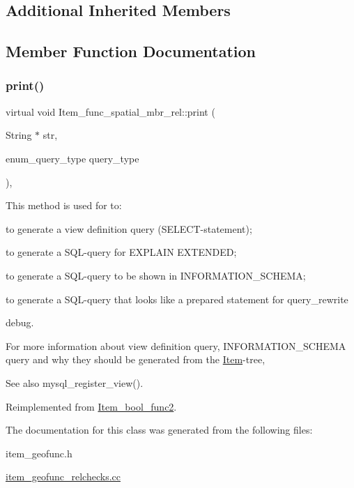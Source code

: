 \subsection*{Additional Inherited Members}


\subsection{Member Function Documentation}
\mbox{\label{classItem__func__spatial__mbr__rel_a0f37964f2e40c8cf415dd81f03795c35}} 
\subsubsection{\texorpdfstring{print()}{print()}}
{\footnotesize\ttfamily virtual void Item\+\_\+func\+\_\+spatial\+\_\+mbr\+\_\+rel\+::print (\begin{DoxyParamCaption}\item[{String $\ast$}]{str,  }\item[{enum\+\_\+query\+\_\+type}]{query\+\_\+type }\end{DoxyParamCaption})\hspace{0.3cm}{\ttfamily [inline]}, {\ttfamily [virtual]}}

This method is used for to\+:
\begin{DoxyItemize}
\item to generate a view definition query (S\+E\+L\+E\+CT-\/statement);
\item to generate a S\+QL-\/query for E\+X\+P\+L\+A\+IN E\+X\+T\+E\+N\+D\+ED;
\item to generate a S\+QL-\/query to be shown in I\+N\+F\+O\+R\+M\+A\+T\+I\+O\+N\+\_\+\+S\+C\+H\+E\+MA;
\item to generate a S\+QL-\/query that looks like a prepared statement for query\+\_\+rewrite
\item debug.
\end{DoxyItemize}

For more information about view definition query, I\+N\+F\+O\+R\+M\+A\+T\+I\+O\+N\+\_\+\+S\+C\+H\+E\+MA query and why they should be generated from the \mbox{\hyperlink{classItem}{Item}}-\/tree, \begin{DoxySeeAlso}{See also}
mysql\+\_\+register\+\_\+view(). 
\end{DoxySeeAlso}


Reimplemented from \mbox{\hyperlink{classItem__bool__func2_a12469a240720c26bef325a4ee5b02f50}{Item\+\_\+bool\+\_\+func2}}.



The documentation for this class was generated from the following files\+:\begin{DoxyCompactItemize}
\item 
item\+\_\+geofunc.\+h\item 
\mbox{\hyperlink{item__geofunc__relchecks_8cc}{item\+\_\+geofunc\+\_\+relchecks.\+cc}}\end{DoxyCompactItemize}
